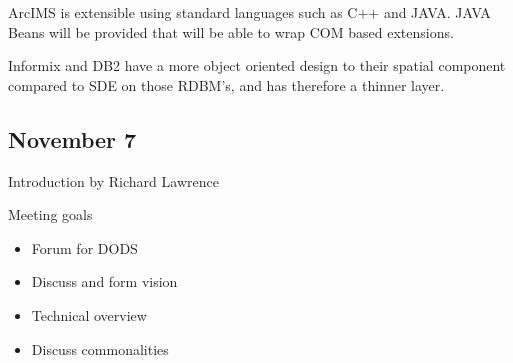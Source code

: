 ArcIMS is extensible using standard languages such as C++ and JAVA. JAVA Beans will be 
provided that will be able to wrap COM based extensions.

Informix and DB2 have a more object oriented design to their spatial component compared to 
SDE on those RDBM's, and has therefore a thinner layer.





\subsection{November 7}


Introduction by Richard Lawrence

Meeting goals
\begin{itemize}
\item   Forum for DODS
\item   Discuss and form vision
\item   Technical overview
\item   Discuss commonalities
\end{itemize}

